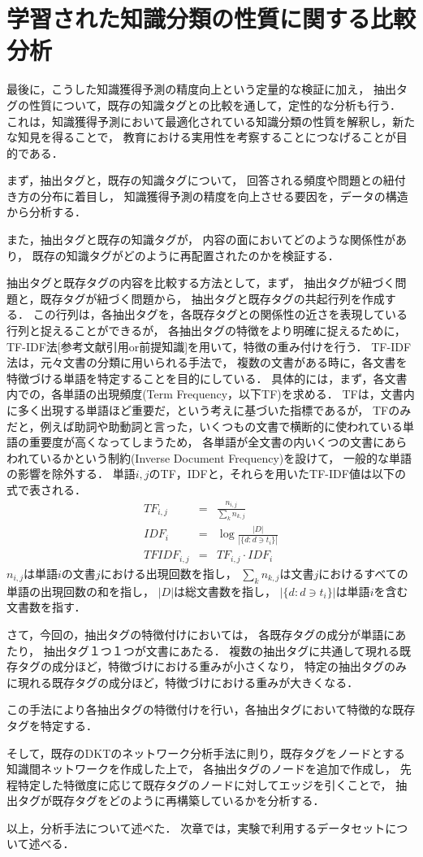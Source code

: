 \section{学習された知識分類の性質に関する比較分析}
最後に，こうした知識獲得予測の精度向上という定量的な検証に加え，
抽出タグの性質について，既存の知識タグとの比較を通して，定性的な分析も行う．
これは，知識獲得予測において最適化されている知識分類の性質を解釈し，新たな知見を得ることで，
教育における実用性を考察することにつなげることが目的である．

まず，抽出タグと，既存の知識タグについて，
回答される頻度や問題との紐付き方の分布に着目し，
知識獲得予測の精度を向上させる要因を，データの構造から分析する．

また，抽出タグと既存の知識タグが，
内容の面においてどのような関係性があり，
既存の知識タグがどのように再配置されたのかを検証する．

抽出タグと既存タグの内容を比較する方法として，まず，
抽出タグが紐づく問題と，既存タグが紐づく問題から，
抽出タグと既存タグの共起行列を作成する．
この行列は，各抽出タグを，各既存タグとの関係性の近さを表現している行列と捉えることができるが，
各抽出タグの特徴をより明確に捉えるために，TF-IDF法[参考文献引用or前提知識]を用いて，特徴の重み付けを行う．
TF-IDF法は，元々文書の分類に用いられる手法で，
複数の文書がある時に，各文書を特徴づける単語を特定することを目的にしている．
具体的には，まず，各文書内での，各単語の出現頻度(Term Frequency，以下TF)を求める．
TFは，文書内に多く出現する単語ほど重要だ，という考えに基づいた指標であるが，
TFのみだと，例えば助詞や助動詞と言った，いくつもの文書で横断的に使われている単語の重要度が高くなってしまうため，
各単語が全文書の内いくつの文書にあらわれているかという制約(Inverse Document Frequency)を設けて，
一般的な単語の影響を除外する．
単語$i,j$のTF，IDFと，それらを用いたTF-IDF値は以下の式で表される．
\begin{eqnarray}
TF_{i,j} &=& \frac {n_{i,j}}{\sum _{k}n_{k,j}}
\\
IDF_i &=& \log {\frac {|D|}{|\{d:d\ni t_{i}\}|}}
\\
TFIDF_{i,j} &=& TF_{i,j} \cdot IDF_i
\end{eqnarray}
$n_{i,j}$は単語$i$の文書$j$における出現回数を指し，
$\sum _{k}n_{k,j}$は文書$j$におけるすべての単語の出現回数の和を指し，
$|D|$は総文書数を指し，
$|\{d:d\ni t_{i}\}|$は単語$i$を含む文書数を指す．


さて，今回の，抽出タグの特徴付けにおいては，
各既存タグの成分が単語にあたり，
抽出タグ１つ１つが文書にあたる．
複数の抽出タグに共通して現れる既存タグの成分ほど，特徴づけにおける重みが小さくなり，
特定の抽出タグのみに現れる既存タグの成分ほど，特徴づけにおける重みが大きくなる．

この手法により各抽出タグの特徴付けを行い，各抽出タグにおいて特徴的な既存タグを特定する．

そして，既存のDKTのネットワーク分析手法に則り，既存タグをノードとする知識間ネットワークを作成した上で，
各抽出タグのノードを追加で作成し，
先程特定した特徴度に応じて既存タグのノードに対してエッジを引くことで，
抽出タグが既存タグをどのように再構築しているかを分析する．


\vvspace
以上，分析手法について述べた．
次章では，実験で利用するデータセットについて述べる．

